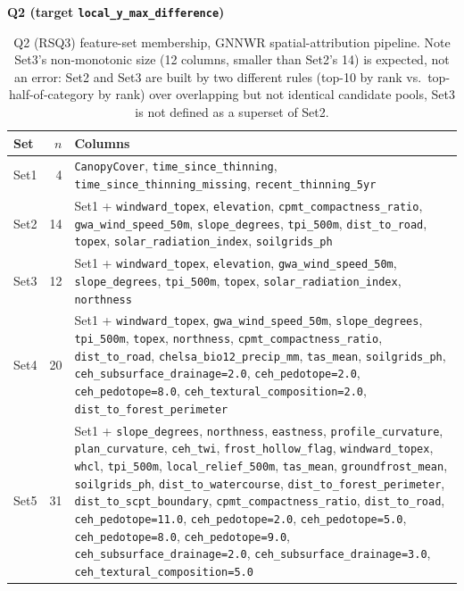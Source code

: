 \begin{table}[H]
\centering
\textbf{Q2 (target \texttt{local\_y\_max\_difference})}\\[4pt]
\scriptsize
\renewcommand{\arraystretch}{1.1}
\begin{tabularx}{\linewidth}{@{} l r >{\raggedright\arraybackslash}X @{}}
\toprule
Set & $n$ & Columns \\
\midrule
Set1 & 4 & \texttt{CanopyCover}, \texttt{time\_since\_thinning}, \texttt{time\_since\_thinning\_missing}, \texttt{recent\_thinning\_5yr} \\
Set2 & 14 & Set1 + \texttt{windward\_topex}, \texttt{elevation}, \texttt{cpmt\_compactness\_ratio}, \texttt{gwa\_wind\_speed\_50m}, \texttt{slope\_degrees}, \texttt{tpi\_500m}, \texttt{dist\_to\_road}, \texttt{topex}, \texttt{solar\_radiation\_index}, \texttt{soilgrids\_ph} \\
Set3 & 12 & Set1 + \texttt{windward\_topex}, \texttt{elevation}, \texttt{gwa\_wind\_speed\_50m}, \texttt{slope\_degrees}, \texttt{tpi\_500m}, \texttt{topex}, \texttt{solar\_radiation\_index}, \texttt{northness} \\
Set4 & 20 & Set1 + \texttt{windward\_topex}, \texttt{gwa\_wind\_speed\_50m}, \texttt{slope\_degrees}, \texttt{tpi\_500m}, \texttt{topex}, \texttt{northness}, \texttt{cpmt\_compactness\_ratio}, \texttt{dist\_to\_road}, \texttt{chelsa\_bio12\_precip\_mm}, \texttt{tas\_mean}, \texttt{soilgrids\_ph}, \texttt{ceh\_subsurface\_drainage=2.0}, \texttt{ceh\_pedotope=2.0}, \texttt{ceh\_pedotope=8.0}, \texttt{ceh\_textural\_composition=2.0}, \texttt{dist\_to\_forest\_perimeter} \\
Set5 & 31 & Set1 + \texttt{slope\_degrees}, \texttt{northness}, \texttt{eastness}, \texttt{profile\_curvature}, \texttt{plan\_curvature}, \texttt{ceh\_twi}, \texttt{frost\_hollow\_flag}, \texttt{windward\_topex}, \texttt{whcl}, \texttt{tpi\_500m}, \texttt{local\_relief\_500m}, \texttt{tas\_mean}, \texttt{groundfrost\_mean}, \texttt{soilgrids\_ph}, \texttt{dist\_to\_watercourse}, \texttt{dist\_to\_forest\_perimeter}, \texttt{dist\_to\_scpt\_boundary}, \texttt{cpmt\_compactness\_ratio}, \texttt{dist\_to\_road}, \texttt{ceh\_pedotope=11.0}, \texttt{ceh\_pedotope=2.0}, \texttt{ceh\_pedotope=5.0}, \texttt{ceh\_pedotope=8.0}, \texttt{ceh\_pedotope=9.0}, \texttt{ceh\_subsurface\_drainage=2.0}, \texttt{ceh\_subsurface\_drainage=3.0}, \texttt{ceh\_textural\_composition=5.0} \\
\bottomrule
\end{tabularx}
\caption{\small{Q2 (RSQ3) feature-set membership, GNNWR spatial-attribution pipeline. Note Set3's non-monotonic size (12 columns, smaller than Set2's 14) is expected, not an error: Set2 and Set3 are built by two different rules (top-10 by rank vs.\ top-half-of-category by rank) over overlapping but not identical candidate pools, Set3 is not defined as a superset of Set2.}}
\label{tab:feature-sets-q2}
\end{table}

